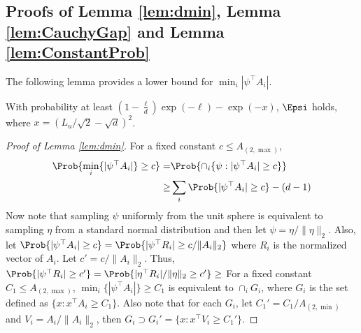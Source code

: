 \subsection{Proofs of Lemma \ref{lem:dmin}, Lemma \ref{lem:CauchyGap} and Lemma \ref{lem:ConstantProb}}
\label{sec:events}
The following lemma provides a lower bound for $\min_i |\psi^{\top}A_i|$.
\begin{lemma}
\label{lem:dmin}
With probability at least $\left(1- \frac{\ell}{d}\right)\exp(-\ell) - \exp(-x)$, $\Epsi$ holds, where $x=(L_u/\sqrt{2}-\sqrt{d})^2$.
\end{lemma}
\begin{proof}[Proof of Lemma \ref{lem:dmin}]
For a fixed constant $c \le A_{(2,\max)}$,
\begin{align*}
\Prob{\min_i \{|\psi^{\top}A_i|\} \ge c} = & \Prob{\cap_i\{\psi : |\psi^{\top}A_i|\ge c\}}\\
 \ge & \sum_i \Prob{|\psi^{\top}A_i|\ge c} - (d-1)
\end{align*}
Now note that sampling $\psi$ uniformly from the unit sphere is equivalent to sampling $\eta$ from a standard normal distribution and then let $\psi = \eta/ \|\eta\|_2$.
Also, let $\Prob{|\psi^{\top}A_i|\ge c} = \Prob{|\psi^{\top}R_i|\ge c/\|A_i\|_2}$ where $R_i$ is the normalized vector of $A_i$. 
Let $c' = c/\|A_i\|_2$. 
Thus, $ \Prob{|\psi^{\top}R_i|\ge c'} = \Prob{|\eta^{\top}R_i|/\|\eta\|_2\ge c'} \ge $
\fi
For a fixed constant $C_1 \le A_{(2,\max)}$, $\min_i \{|\psi^{\top}A_i|\} \ge C_1$ is equivalent to  $\cap_i G_i$, where $G_i$ is the set defined as $\{x: x^{\top}A_i\ge C_1\}$.  
Also note that for each $G_i$, let $C_1' = C_1/A_{(2,\min)}$ and $V_i = A_i/\|A_i\|_2$, then $G_i \supset G_i' = \{x: x^{\top}V_i\ge C_1'\}$.


\end{proof}
